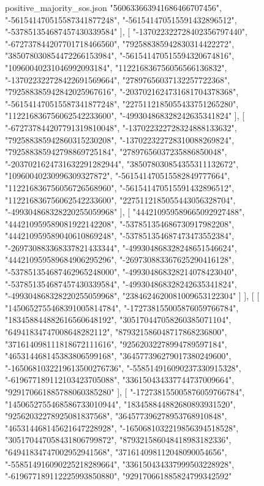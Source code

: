 \begin{filecontents*}[overwrite]{positive_majority_sos.json}
    "560633663941686466707456",
    "-561541470515587341877248",
    "-561541470515591432896512",
    "-537851354687457430339584"
   ],
   [
    "-137022322728402356797440",
    "-672737844207701718466560",
    "792588385942830314422272",
    "385078030854472266153984",
    "-561541470515594320674816",
    "10960040231046992093184",
    "112216836756056566136832",
    "-137022322728422691569664",
    "27897656037132257722368",
    "792588385942842025967616",
    "-2037021624731681704378368",
    "-561541470515587341877248",
    "2275112185055433751265280",
    "112216836756062542233600",
    "-499304868328242635341824"
   ],
   [
    "-672737844207791319810048",
    "-137022322728324888133632",
    "792588385942860315230208",
    "-137022322728310088269824",
    "792588385942798869725184",
    "27897656037235886850048",
    "-2037021624731632291282944",
    "385078030854355311132672",
    "10960040230996309327872",
    "-561541470515582849777664",
    "112216836756056726568960",
    "-561541470515591432896512",
    "112216836756062542233600",
    "2275112185055443056328704",
    "-499304868328220255059968"
   ],
   [
    "444210959589665092927488",
    "444210959589081922142208",
    "-537851354686730917982208",
    "444210959589040610869248",
    "-537851354687473473552384",
    "-269730883368337821433344",
    "-499304868328248651546624",
    "444210959589684906295296",
    "-269730883367625290416128",
    "-537851354687462965248000",
    "-499304868328214078423040",
    "-537851354687457430339584",
    "-499304868328242635341824",
    "-499304868328220255059968",
    "2384624620081009653122304"
   ]
  ],
  [
   [
    "1450652755468391005814784",
    "-172738155005876059766784",
    "183458844882616560648192",
    "305170447058260385071104",
    "64941834747008648282112",
    "879321586048717868236800",
    "371614098111818672111616",
    "92562032278994789597184",
    "465314468145383806599168",
    "364577396279017380249600",
    "-1650681032219613500276736",
    "-558514916090237330915328",
    "-619677189112103423705088",
    "336150434337744737009664",
    "929170661885788060385280"
   ],
   [
    "-172738155005876059766784",
    "1450652755468586733010944",
    "183458844882680893931520",
    "92562032278925081837568",
    "364577396278953768910848",
    "465314468145621647228928",
    "-1650681032219856394518528",
    "305170447058431806799872",
    "879321586048418983182336",
    "64941834747002952941568",
    "371614098112048090054656",
    "-558514916090225218289664",
    "336150434337999503228928",
    "-619677189112225993850880",
    "929170661885824799342592"

\end{filecontents*}
